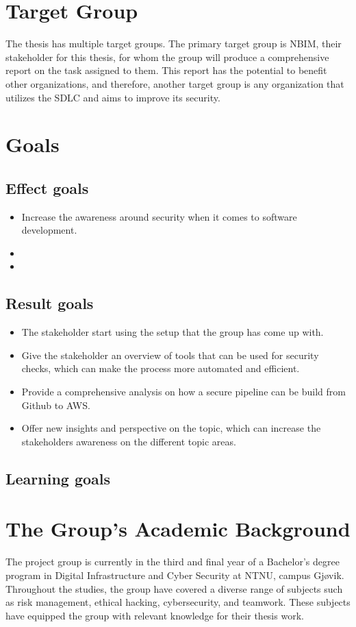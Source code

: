 \section{Target Group}
The thesis has multiple target groups. The primary target group is NBIM, their stakeholder for this thesis, for whom the group will produce a comprehensive report on the task assigned to them. This report has the potential to benefit other organizations, and therefore, another target group is any organization that utilizes the SDLC and aims to improve its security.

\section{Goals}
\subsection{Effect goals}
\begin{itemize}
    \item Increase the awareness around security when it comes to software development. 
    \item 
    \item 
\end{itemize}
\subsection{Result goals}
\begin{itemize}
    \item The stakeholder start using the setup that the group has come up with. 
    \item Give the stakeholder an overview of tools that can be used for security checks, which can make the process more automated and efficient. 
    \item Provide a comprehensive analysis on how a secure pipeline can be build from Github to AWS. 
    \item Offer new insights and perspective on the topic, which can increase the stakeholders awareness on the different topic areas. 
    
\end{itemize}
\subsection{Learning goals} %

\section{The Group’s Academic Background}
The project group is currently in the third and final year of a Bachelor's degree program in Digital Infrastructure and Cyber Security at NTNU, campus Gjøvik. Throughout the studies, the group have covered a diverse range of subjects such as risk management, ethical hacking, cybersecurity, and teamwork. These subjects have equipped the group with relevant knowledge for their thesis work.

